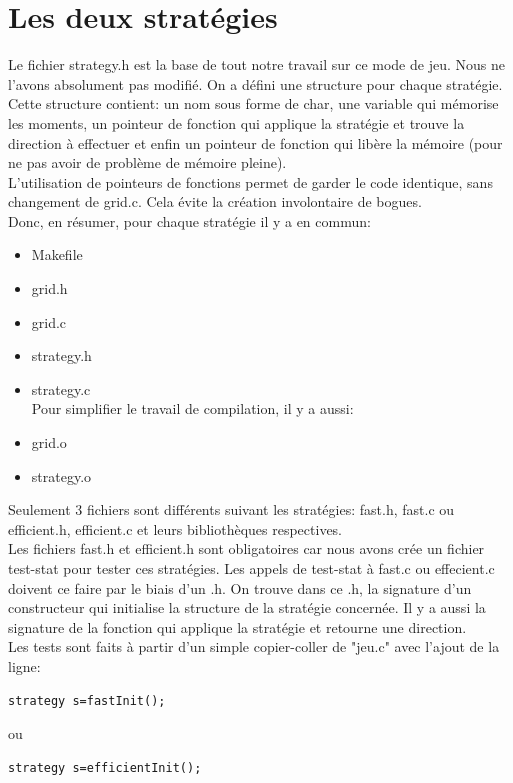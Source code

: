 \documentclass{report}
\begin{document}
\section{Les deux stratégies}
Le fichier strategy.h est la base de tout notre travail sur ce mode de jeu. Nous ne l'avons absolument pas modifié. On a défini une structure pour chaque stratégie. Cette structure contient: un nom sous forme de char, une variable qui mémorise les moments, un pointeur de fonction qui applique la stratégie et trouve la direction à effectuer et enfin un pointeur de fonction qui libère la mémoire (pour ne pas avoir de problème de mémoire pleine).\\
L'utilisation de pointeurs de fonctions permet de garder le code identique, sans changement de grid.c. Cela évite la création involontaire de bogues.\\
Donc, en résumer, pour chaque stratégie il y a en commun:
\begin{itemize}
\item Makefile
\item grid.h
\item grid.c
\item strategy.h
\item strategy.c\\
Pour simplifier le travail de compilation, il y a aussi:
\item grid.o
\item strategy.o\\
\end{itemize}
Seulement 3 fichiers sont différents suivant les stratégies: fast.h, fast.c ou efficient.h, efficient.c et leurs bibliothèques respectives.\\
Les fichiers fast.h et efficient.h sont obligatoires car nous avons crée un fichier test-stat pour tester ces stratégies. Les appels de test-stat à fast.c ou effecient.c doivent ce faire par le biais d'un .h. On trouve dans ce .h, la signature d'un constructeur qui initialise la structure de la stratégie concernée. Il y a aussi la signature de la fonction qui applique la stratégie et retourne une direction.\\
Les tests sont faits à partir d'un simple copier-coller de "jeu.c" avec l'ajout de la ligne:
\begin{lstlisting}[frame=single]
strategy s=fastInit();
\end{lstlisting}
ou
\begin{lstlisting}[frame=single]
strategy s=efficientInit();
\end{lstlisting}
\end{document}
